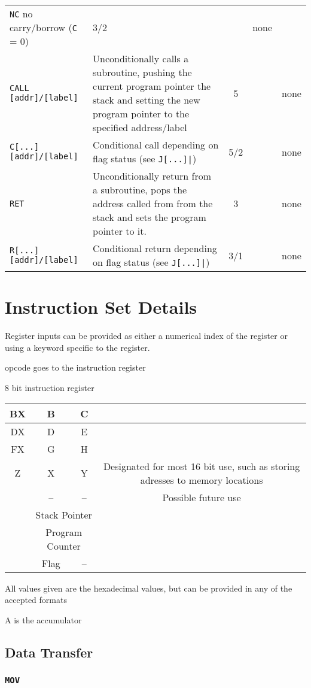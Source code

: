 \documentclass[10pt]{article}
\begin{document}
\begin{tabular}{|p{4cm}p{6cm}cp{1cm}p{2cm}|}
\newline\verb|NC| no carry/borrow (\verb|C| = 0) & 3/2 && none\\
\verb|CALL [addr]/[label]| & Unconditionally calls a subroutine, pushing the current program pointer the stack and setting the new program pointer to the specified address/label & 5 & & none \\
\verb|C[...] [addr]/[label]| & Conditional call depending on flag status (see \texttt{J[...]|}) & 5/2 && none\\
\verb|RET| & Unconditionally return from a subroutine, pops the address called from from the stack and sets the program pointer to it. & 3 & & none \\
\verb|R[...] [addr]/[label]| & Conditional return depending on flag status (see \texttt{J[...]|}) & 3/1 && none\\
\hline
\end{tabular}

\section{Instruction Set Details}
Register inputs can be provided as either a numerical index of the register or using a keyword specific to the register.

opcode goes to the instruction register

8 bit instruction register 

\begin{tabular}{c|c|c|c}
\hline
BX & B & C &\\
\hline
DX & D & E &\\
\hline
FX & G & H &\\
\hline
Z & X & Y & Designated for most 16 bit use, such as storing adresses to memory locations\\
\hline
 & -- & -- & Possible future use\\
\hline
 & \multicolumn{2}{c|}{Stack Pointer} &\\
\hline
& \multicolumn{2}{c|}{Program Counter} &\\
\hline
& Flag & -- &\\
\hline
\end{tabular}

All values given are the hexadecimal values, but can be provided in any of the accepted formats

A is the accumulator

\subsection{Data Transfer}
\subsubsection{\texttt{MOV}}
\end{document}
